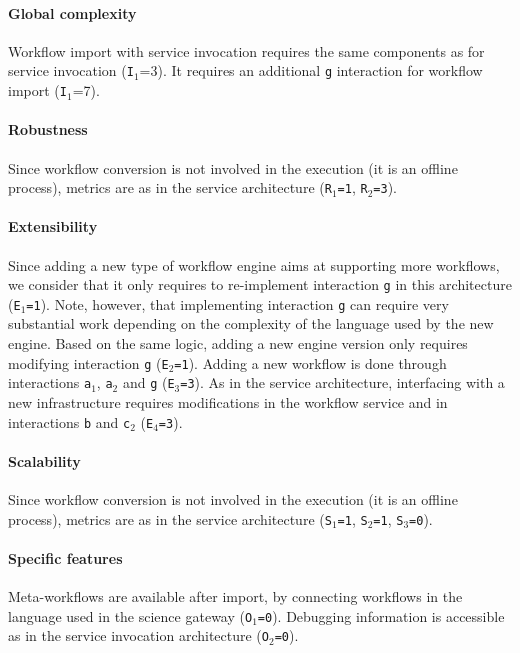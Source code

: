 \documentclass[preprint,3p,twocolumn]{elsarticle}
\begin{document}
\paragraph{Global complexity} Workflow import with service invocation
requires the same components as for service invocation
(\texttt{I$_1$}=3). It requires an additional \texttt{g} interaction
for workflow import (\texttt{I$_1$}=7).

\paragraph{Robustness} Since workflow conversion is not involved in
the execution (it is an offline process), metrics are as in the
service architecture (\texttt{R$_1$=1}, \texttt{R$_2$=3}).

\paragraph{Extensibility} Since adding a new type of workflow engine
aims at supporting more workflows, we consider that it only requires
to re-implement interaction \texttt{g} in this architecture  (\texttt{E$_1$=1}). Note,
however, that implementing interaction \texttt{g} can require very
substantial work depending on the complexity of the language used by
the new engine. Based on the same logic, adding a
new engine version only requires modifying interaction \texttt{g}
(\texttt{E$_2$=1}).  Adding a new workflow is done through
interactions \texttt{a$_1$}, \texttt{a$_2$} and \texttt{g} (\texttt{E$_3$=3}). As in the
service architecture, interfacing with a new infrastructure requires
modifications in the workflow service and in interactions \texttt{b}
and \texttt{c$_2$} (\texttt{E$_4$=3}).

\paragraph{Scalability}  Since workflow conversion is not involved in
the execution (it is an offline process), metrics are as in the
service architecture (\texttt{S$_1$=1},
\texttt{S$_2$=1}, \texttt{S$_3$=0}).

\paragraph{Specific features} Meta-workflows are available after import,
by connecting workflows in the language used in the science gateway
(\texttt{O$_1$=0}). Debugging information is accessible as in the
service invocation architecture (\texttt{O$_2$=0}).
\end{document}
